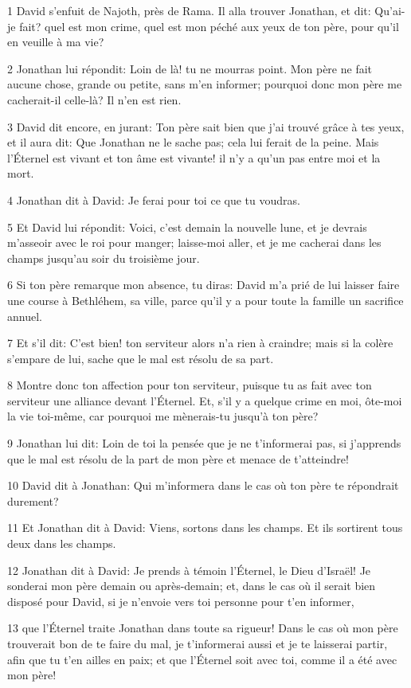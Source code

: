 \par 1 David s'enfuit de Najoth, près de Rama. Il alla trouver Jonathan, et dit: Qu'ai-je fait? quel est mon crime, quel est mon péché aux yeux de ton père, pour qu'il en veuille à ma vie?
\par 2 Jonathan lui répondit: Loin de là! tu ne mourras point. Mon père ne fait aucune chose, grande ou petite, sans m'en informer; pourquoi donc mon père me cacherait-il celle-là? Il n'en est rien.
\par 3 David dit encore, en jurant: Ton père sait bien que j'ai trouvé grâce à tes yeux, et il aura dit: Que Jonathan ne le sache pas; cela lui ferait de la peine. Mais l'Éternel est vivant et ton âme est vivante! il n'y a qu'un pas entre moi et la mort.
\par 4 Jonathan dit à David: Je ferai pour toi ce que tu voudras.
\par 5 Et David lui répondit: Voici, c'est demain la nouvelle lune, et je devrais m'asseoir avec le roi pour manger; laisse-moi aller, et je me cacherai dans les champs jusqu'au soir du troisième jour.
\par 6 Si ton père remarque mon absence, tu diras: David m'a prié de lui laisser faire une course à Bethléhem, sa ville, parce qu'il y a pour toute la famille un sacrifice annuel.
\par 7 Et s'il dit: C'est bien! ton serviteur alors n'a rien à craindre; mais si la colère s'empare de lui, sache que le mal est résolu de sa part.
\par 8 Montre donc ton affection pour ton serviteur, puisque tu as fait avec ton serviteur une alliance devant l'Éternel. Et, s'il y a quelque crime en moi, ôte-moi la vie toi-même, car pourquoi me mènerais-tu jusqu'à ton père?
\par 9 Jonathan lui dit: Loin de toi la pensée que je ne t'informerai pas, si j'apprends que le mal est résolu de la part de mon père et menace de t'atteindre!
\par 10 David dit à Jonathan: Qui m'informera dans le cas où ton père te répondrait durement?
\par 11 Et Jonathan dit à David: Viens, sortons dans les champs. Et ils sortirent tous deux dans les champs.
\par 12 Jonathan dit à David: Je prends à témoin l'Éternel, le Dieu d'Israël! Je sonderai mon père demain ou après-demain; et, dans le cas où il serait bien disposé pour David, si je n'envoie vers toi personne pour t'en informer,
\par 13 que l'Éternel traite Jonathan dans toute sa rigueur! Dans le cas où mon père trouverait bon de te faire du mal, je t'informerai aussi et je te laisserai partir, afin que tu t'en ailles en paix; et que l'Éternel soit avec toi, comme il a été avec mon père!
